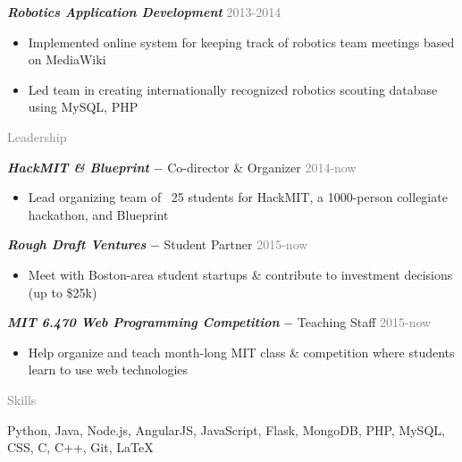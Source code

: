 \documentclass[11pt]{article}
\newcommand{\rsection}[1]{\vspace{1em}\textcolor{gray}{\Large \robotoslab #1}\vspace{0.5em}}
\newcommand{\bt}[1]{\textit{\textbf{#1}}} %
\newcommand{\gap}[0]{\vspace{0.5em}} %
\newcommand{\dash}[0]{ $-$ } %
\newcommand{\gray}[1]{\textcolor{gray}{#1}}
\begin{document}
\bt{Robotics Application Development} \hfill \gray{2013-2014}

\begin{itemize}
\item Implemented online system for keeping track of robotics team meetings based on MediaWiki
\item Led team in creating internationally recognized robotics scouting database using MySQL, PHP
\end{itemize}

\rsection{Leadership}

\bt{HackMIT \& Blueprint}\dash Co-director \& Organizer \hfill \gray{2014-now}

\begin{itemize}
\item Lead organizing team of ~25 students for HackMIT, a 1000-person collegiate hackathon, and Blueprint
\end{itemize}

\gap

\bt{Rough Draft Ventures}\dash Student Partner \hfill \gray{2015-now}

\begin{itemize}
\item Meet with Boston-area student startups \& contribute to investment decisions (up to \$25k)
\end{itemize}

\gap

\bt{MIT 6.470 Web Programming Competition}\dash Teaching Staff \hfill \gray{2015-now}

\begin{itemize}
\item Help organize and teach month-long MIT class \& competition where students learn to use web technologies
\end{itemize}

\rsection{Skills}

Python, Java, Node.js, AngularJS, JavaScript, Flask, MongoDB, PHP, MySQL, CSS, C, C++, Git, {\selectfont\LaTeX}
\end{document}
